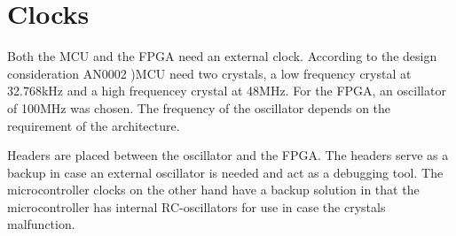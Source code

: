 \documentclass[../main/report.tex]{subfiles}
\begin{document}
\section{Clocks}
Both the MCU and the FPGA need an external clock.
According to the design consideration AN0002 \cite{efm32gg-design-consideration})MCU need two crystals, a low frequency crystal at 32.768kHz and a high frequencey crystal at 48MHz. 
For the FPGA, an oscillator of 100MHz was chosen. The frequency of the oscillator depends on the requirement of the architecture.

Headers are placed between the oscillator and the FPGA. 
The headers serve as a backup in case an external oscillator is needed and act as a debugging tool.
The microcontroller clocks on the other hand have a backup solution in that the microcontroller has internal RC-oscillators for use in case the crystals malfunction.
\end{document}

